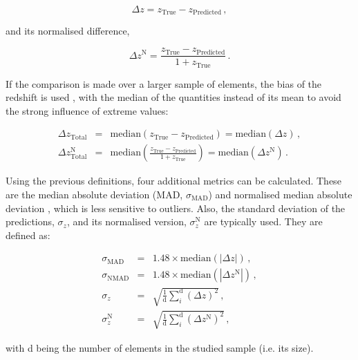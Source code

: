 \documentclass{aa}
\begin{document}
\begin{equation}
\Delta z = z_{\mathrm{True}} - z_{\mathrm{Predicted}}\,,
\end{equation}

\noindent and its normalised difference,

\begin{equation}\label{eq:delta_z_N}
\Delta z^{\mathrm{N}} = \frac{z_{\mathrm{True}} - z_{\mathrm{Predicted}}}{1 + z_{\mathrm{True}}}\,.
\end{equation}

If the comparison is made over a larger sample of elements, the bias of the redshift is used \citep{2013ApJ...775...93D}, with the median of the quantities instead of its mean to avoid the strong influence of extreme values:

\begin{eqnarray}
\Delta z_{\mathrm{Total}} &=& \mathrm{median}\left(z_{\mathrm{True}} - z_{\mathrm{Predicted}}\right) = \mathrm{median}(\Delta z)\,,\\
\Delta z_{\mathrm{Total}}^{\mathrm{N}} &=& \mathrm{median}\left(\frac{z_{\mathrm{True}} - z_{\mathrm{Predicted}}}{1 + z_{\mathrm{True}}}\right) = \mathrm{median}(\Delta z^{\mathrm{N}})\,.
\end{eqnarray}

Using the previous definitions, four additional metrics can be calculated. These are the median absolute deviation (MAD, $\sigma_{\mathrm{MAD}}$) and normalised median absolute deviation \citep[NMAD, $\sigma_{\mathrm{NMAD}}$;][]{hoaglin1983understanding, 2009ApJ...690.1236I}, which is less sensitive to outliers. Also, the standard deviation of the predictions, $\sigma_{z}$, and its normalised version, $\sigma_{z}^{\mathrm{N}}$ are typically used. They are defined as:

\begin{eqnarray}
\sigma_{\mathrm{MAD}} &=& 1.48 \times \mathrm{median}\left(|\Delta z|\right)\,,\\
\sigma_{\mathrm{NMAD}} &=& 1.48 \times \mathrm{median}\left(\left|\Delta z^{\mathrm{N}}\right|\right)\,,\\
\sigma_{z} &=& \sqrt{\frac{1}{\mathrm{d}} \sum_{i}^{\mathrm{d}} \left(\Delta z\right)^{2}}\,,\\
\sigma_{z}^{\mathrm{N}} &=& \sqrt{\frac{1}{\mathrm{d}} \sum_{i}^{\mathrm{d}} \left(\Delta z^{\mathrm{N}}\right)^{2}}\,,
\end{eqnarray}

\noindent with d being the number of elements in the studied sample (i.e. its size).
\end{document}
